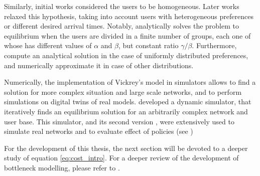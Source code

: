 Similarly, initial works considered the users to be homogeneous.
Later works relaxed this hypothesis, taking into account users with heterogeneous preferences or different desired arrival times.
Notably, \textcite{arnott1988schedule} analytically solves the problem to equilibrium when the users are divided in a finite number of groups,
each one of whose has different values of \(\alpha\) and \(\beta\),
but constant ratio \(\gamma/\beta\).
Furthermore, \textcite{amirgholy2017analytical} compute an analytical solution in the case of uniformly distributed preferences,
and numerically approximate it in case of other distributions.

Numerically, the implementation of Vickrey's model in simulators allows to find a solution for more complex situation and large scale networks,
and to perform simulations on digital twins of real models.
\textcite{de1997metropolis} developed a dynamic simulator, that iteratively finds an equilibrium solution for an arbitrarily complex network and user base.
This simulator, and its second version \parencite{RePEc:ema:worpap:2024-03},
were extensively used to simulate real networks and to evaluate effect of policies (see \cite{de2002real,de2005congestion,de2006modelling})

For the development of this thesis,
the next section will be devoted to a deeper study of equation \eqref{eq:cost_intro}.
For a deeper review of the development of bottleneck modelling, please refer to \cite{LI2020311}.




